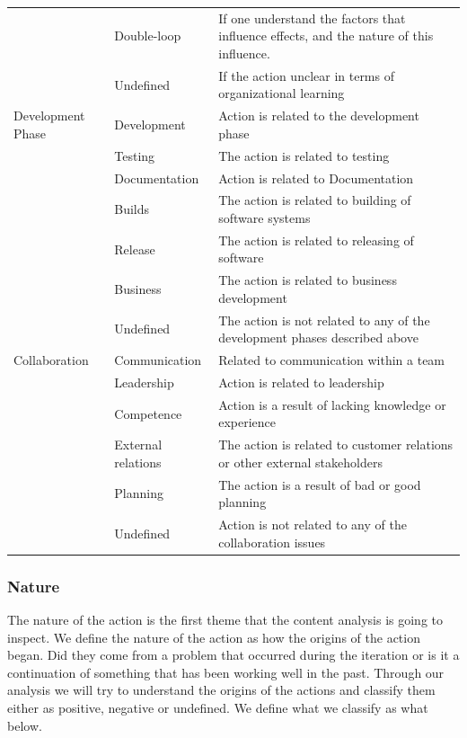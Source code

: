 \begin{table}[h]
\begin{center}
\begin{adjustbox}{width=\textwidth, totalheight=0.9\textheight, keepaspectratio}
\begin{tabular}{| l | l | p{} |}
			& Double-loop & If one understand the factors that influence effects, and the nature of this influence. \\ \cline{2-3}
			& Undefined & If the action unclear in terms of organizational learning \\ \hline
			Development Phase & Development & Action is related to the development phase \\ \cline{2-3}
			& Testing & The action is related to testing \\ \cline{2-3}
			& Documentation & Action is related to Documentation \\ \cline{2-3}
			& Builds & The action is related to building of software systems \\ \cline{2-3}
			& Release & The action is related to releasing of software \\ \cline{2-3}
			& Business & The action is related to business development \\ \cline{2-3}
			& Undefined & The action is not related to any of the development phases described above \\ 
			\hline
			Collaboration & Communication & Related to communication within a team \\ \cline{2-3}
			& Leadership & Action is related to leadership \\ \cline{2-3}
			& Competence & Action is a result of lacking knowledge or experience \\ \cline{2-3}
			& External relations & The action is related to customer relations or other external stakeholders \\ \cline{2-3}
			& Planning & The action is a result of bad or good planning \\ \cline{2-3}
			& Undefined & Action is not related to any of the collaboration issues \\
			\hline
			\end{tabular}
		\end{adjustbox}
	\end{center}
\end{table}
\afterpage{\clearpage}

\subsubsection{Nature}
The nature of the action is the first theme that the content analysis is going to inspect. We define the nature of the action as how the origins of the action began. Did they come from a problem that occurred during the iteration or is it a continuation of something that has been working well in the past. Through our analysis we will try to understand the origins of the actions and classify them either as positive, negative or undefined. We define what we classify as what below. 
